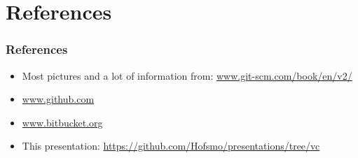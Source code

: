 \section[References]{References}
\begin{frame}
	\frametitle{References}
	\begin{itemize}
		\item Most pictures and a lot of information from:
				\url{www.git-scm.com/book/en/v2/}
		\item \url{www.github.com}
		\item \url{www.bitbucket.org}
		\item This presentation:
				\url{https://github.com/Hofsmo/presentations/tree/vc}
	\end{itemize}
\end{frame}
